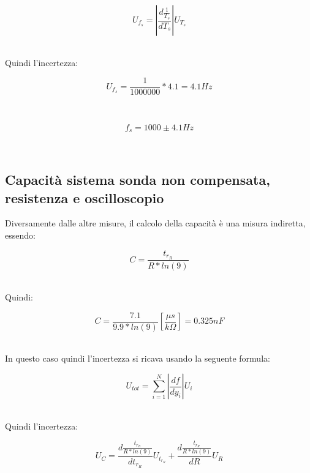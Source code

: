 \documentclass[a4paper]{article}
\begin{document}
\begin{Large}
	\begin{equation}
		{U_{f_s}}= |\frac{d\frac{1}{T_s}}{d{T_s}}|U_{{T_s}}
	\end{equation}
\end{Large}\\
Quindi l'incertezza:
\begin{Large}
	\begin{equation}
		{U_{f_s}}= \frac{1}{1000000}*4.1=4.1 Hz
	\end{equation}
\end{Large}\\
\begin{Large}
	\begin{equation}
  		{f_s}= 1000\pm 4.1Hz
	\end{equation}
\end{Large}\\

\subsection{Capacità sistema sonda non compensata, resistenza e oscilloscopio}
Diversamente dalle altre misure, il calcolo della capacità è una misura indiretta, essendo: 
\begin{Large}
	\begin{equation}
  		C= \frac{t_{r_R}}{R*ln(9)}
	\end{equation}
\end{Large}\\

Quindi:
\begin{Large}
	\begin{equation}
  		C= \frac{7.1}{9.9*ln(9)} [\frac{\mu s}{k\Omega}]= 0.325nF
	\end{equation}
\end{Large}\\

In questo caso quindi l'incertezza si ricava usando la seguente formula: 
\begin{Large}
	\begin{equation}
		U_{tot}=\sum_{i=1}^{N}|{\frac{df}{dy_i}}| U_i
	\end{equation}
\end{Large}\\

Quindi l'incertezza:
\begin{Large}
	\begin{equation}
		{U_C}= \frac{d\frac{t_{r_R}}{R*ln(9)}}{dt_{r_R}}U_{t_{r_R}}+\frac{d\frac{t_{r_R}}{R*ln(9)}}{dR}U_{R}
	\end{equation}
\end{Large}\\
\end{document}

